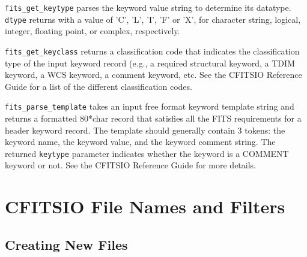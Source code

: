 \documentclass[11pt]{article}
\begin{document}
{\tt fits\_get\_keytype} parses the keyword value string to determine its
datatype.  {\tt dtype} returns with a value of 'C', 'L', 'I', 'F' or
'X', for character string, logical, integer, floating point, or
complex, respectively.

{\tt fits\_get\_keyclass} returns a classification code that indicates
the classification type of the input keyword record (e.g., a required
structural keyword, a TDIM keyword, a WCS keyword, a comment keyword,
etc.  See the CFITSIO Reference Guide for a list of the different
classification codes.

{\tt fits\_parse\_template} takes an input free format keyword template
string and returns a formatted 80*char record that satisfies all the
FITS requirements for a header keyword record.  The template should
generally contain 3 tokens: the keyword name, the keyword value, and
the keyword comment string.  The returned {\tt keytype} parameter
indicates whether the keyword is a COMMENT keyword or not.   See the
CFITSIO Reference Guide for more details.

\newpage
\section{CFITSIO File Names and Filters}

\subsection{Creating New Files}
\end{document}

